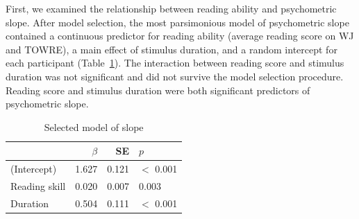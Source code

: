 \documentclass[../uwthesis.tex]{subfiles}
\begin{document}
First, we examined the relationship between reading ability and psychometric slope. After model selection, the most parsimonious model of psychometric slope contained a continuous predictor for reading ability (average reading score on WJ and TOWRE), a main effect of stimulus duration, and a random intercept for each participant (Table~\ref{tab:p2_slope_model}).  The interaction between reading score and stimulus duration was not significant and did not survive the model selection procedure. Reading score and stimulus duration were both significant predictors of psychometric slope.

\begin{table}
\centering
\caption{Selected model of slope}
\label{tab:p2_slope_model}
    \begin{tabular}{lrrl}
    \toprule
      & $\beta$ & SE & $p$\\
    \midrule
    (Intercept) & 1.627 & 0.121 & $<$ 0.001\\
    Reading skill & 0.020 & 0.007 & 0.003\\
    Duration & 0.504 & 0.111 & $<$ 0.001\\
    \bottomrule
    \end{tabular}
\end{table}
\end{document}
